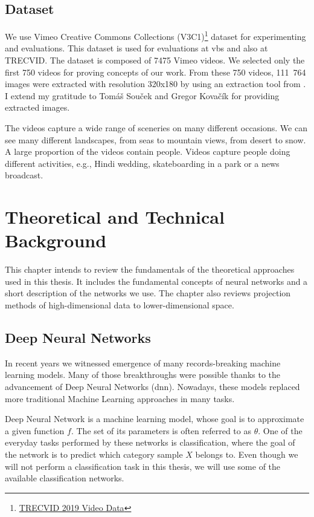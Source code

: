 \section{Dataset}
\label{s:dataset}

We use Vimeo Creative Commons Collections (V3C1)\footnote{\href{https://www-nlpir.nist.gov/projects/tv2019/data.html}{TRECVID 2019 Video Data}} dataset for experimenting and evaluations. This dataset is used for evaluations at \acrshort{vbs} and also at TRECVID. The dataset is composed of 7475 Vimeo videos. We selected only the first 750 videos for proving concepts of our work. From these 750 videos, 111\ 764 images were extracted with resolution 320x180 by using an extraction tool from \cite{lokovc2019framework}. I extend my gratitude to Tomáš Souček and Gregor Kovačík for providing extracted images.

The videos capture a wide range of sceneries on many different occasions. We can see many different landscapes, from seas to mountain views, from desert to snow. A large proportion of the videos contain people. Videos capture people doing different activities, e.g., Hindi wedding, skateboarding in a park or a news broadcast.


\chapter{Theoretical and Technical Background}
\label{ch:technical_background}

This chapter intends to review the fundamentals of the theoretical approaches used in this thesis. It includes the fundamental concepts of neural networks and a short description of the networks we use. The chapter also reviews projection methods of high-dimensional data to lower-dimensional space.

\section{Deep Neural Networks}

In recent years we witnessed emergence of many records-breaking machine learning models. Many of those breakthroughs were possible thanks to the advancement of Deep Neural Networks (\acrshort{dnn}). Nowadays, these models replaced more traditional Machine Learning approaches in many tasks.

Deep Neural Network is a machine learning model, whose goal is to approximate a given function \(f\). The set of its parameters is often referred to as \(\theta\). One of the everyday tasks performed by these networks is classification, where the goal of the network is to predict which category sample \(X\) belongs to. Even though we will not perform a classification task in this thesis, we will use some of the available classification networks.

